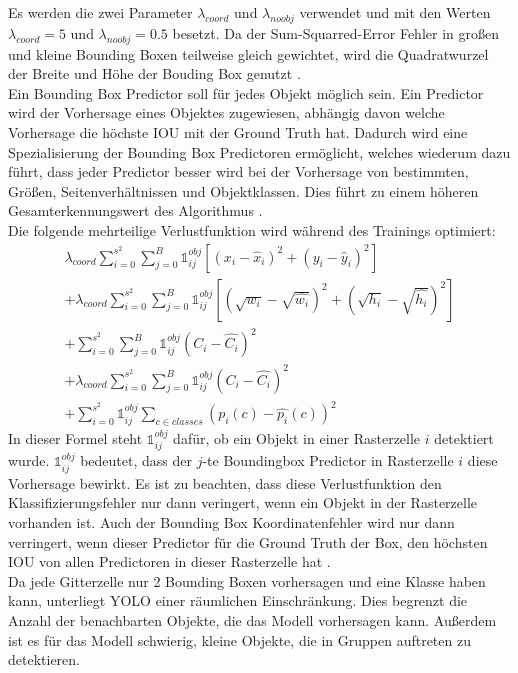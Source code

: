 {{	Es werden die zwei Parameter $\lambda_{coord}$ und $\lambda_{noobj}$ verwendet und  mit den Werten  $\lambda_{coord} = 5$ und $\lambda_{noobj} = 0.5$ besetzt.
	Da der Sum-Squarred-Error Fehler in großen und kleine Bounding Boxen teilweise gleich gewichtet, wird die Quadratwurzel der Breite und Höhe der Bouding Box genutzt \citep{Plastiras2018}. \\
	Ein Bounding Box Predictor soll für jedes Objekt möglich sein. Ein Predictor wird  der Vorhersage eines Objektes zugewiesen, abhängig davon welche Vorhersage die höchste IOU mit der Ground Truth hat. Dadurch wird eine Spezialisierung der Bounding Box Predictoren ermöglicht, welches wiederum dazu führt, dass jeder Predictor besser wird bei der Vorhersage von bestimmten, Größen, Seitenverhältnissen und Objektklassen. Dies führt zu einem höheren Gesamterkennungswert des Algorithmus \citep{Plastiras2018}. \\
	Die folgende mehrteilige Verlustfunktion wird während des Trainings optimiert:
	\begin{multline}
		\lambda_{coord} \sum_{i=0}^{s^2} \sum_{j=0}^{B} \mathbb{1}_{i j}^{obj}\left[(x_i-\hat{x}_i)^2 + (y_i - \hat{y}_i)^2\right]\\
		+ \lambda_{coord} \sum_{i=0}^{s^2} \sum_{j=0}^{B} \mathbb{1}_{i j}^{obj}\left[\left(\sqrt{w_i} - \sqrt{\hat{w_i}}\right)^2 + \left(\sqrt{h_i}-\sqrt{\hat{h_i}}\right)^2\right]\\
		+ \sum_{i=0}^{s^2} \sum_{j=0}^{B} \mathbb{1}_{i j}^{obj}\left(C_i - \hat{C_i}\right)^2\\
		+ \lambda_{coord} \sum_{i=0}^{s^2} \sum_{j=0}^{B} \mathbb{1}_{i j}^{obj}\left(C_i - \hat{C_i}\right)^2\\
		+ \sum_{i=0}^{s^2} \mathbb{1}_{i j}^{obj} \sum_{c \in classes } \left(p_i(c)-\hat{p_i}(c)\right)^2
	\end{multline}
	In dieser Formel steht $\mathbb{1}_{i j}^{obj}$ dafür, ob ein Objekt in einer Rasterzelle $i$ detektiert wurde. $\mathbb{1}_{i j}^{obj}$ bedeutet, dass der $j$-te Boundingbox Predictor in Rasterzelle $i$ diese Vorhersage bewirkt. Es ist zu beachten, dass diese Verlustfunktion den Klassifizierungsfehler nur dann veringert, wenn ein Objekt in der Rasterzelle vorhanden ist. Auch der Bounding Box Koordinatenfehler wird nur dann verringert, wenn dieser Predictor für die Ground Truth der Box, den höchsten IOU von allen Predictoren in dieser Rasterzelle hat \citep{Plastiras2018}. \\
	Da jede Gitterzelle nur 2 Bounding Boxen vorhersagen und eine Klasse haben kann, unterliegt YOLO einer räumlichen Einschränkung. Dies begrenzt die Anzahl der benachbarten Objekte, die das Modell vorhersagen kann. Außerdem ist es für das Modell schwierig, kleine Objekte, die in Gruppen auftreten zu detektieren. \\
}}
